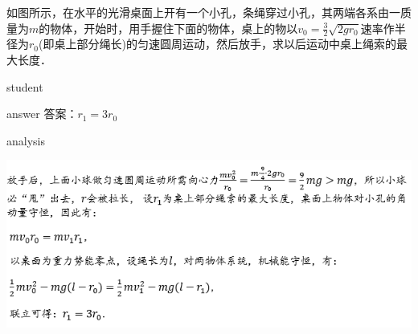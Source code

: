 \begin{example}
	如图所示，在水平的光滑桌面上开有一个小孔，条绳穿过小孔，其两端各系由一质量为$ m $的物体，开始时，用手握住下面的物体，桌上的物以$ v_0 = \frac{3}{2}\sqrt{2gr_0} $速率作半径为$ r_0  $(即桌上部分绳长)的匀速圆周运动，然后放手，求以后运动中桌上绳索的最大长度．
	
	\begin{taggedblock}{student}
		\vspace*{2cm}
	\end{taggedblock}
	
	
	\begin{taggedblock}{answer}
		答案：$ r_1 = 3r_0 $
	\end{taggedblock}
	
	
	\begin{taggedblock}{analysis}
		\begin{center}
\includegraphics[width=0.9\linewidth]{image/am-8}
\end{center}

	\end{taggedblock}
\end{example}


